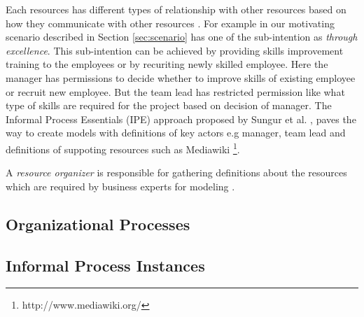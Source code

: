 Each resources has different types of relationship with other resources based on how they communicate with other resources \cite{Sungur2015}. For example in our motivating scenario described in Section \ref{sec:scenario} has one of the sub-intention as \textit{through excellence}. This sub-intention can be achieved by providing skills improvement training to the employees or by recuriting newly skilled employee. Here the manager has permissions to decide whether to improve skills of existing employee or recruit new employee. But the team lead has restricted permission like what type of skills are required for the project based on decision of manager. The Informal Process Essentials (IPE) approach proposed by Sungur et al. \cite{Sungur2015}, paves the way to create models with definitions of key actors e.g manager, team lead and definitions of suppoting resources such as Mediawiki \footnote{http://www.mediawiki.org/}.

A \textit{resource organizer} is responsible for gathering definitions about the resources which are required by business experts for modeling \cite{Sungur2014a}.  



\subsection{Organizational Processes} 
\label{sec:processes}

\subsection{Informal Process Instances} 
\label{sec:ipinstances}
